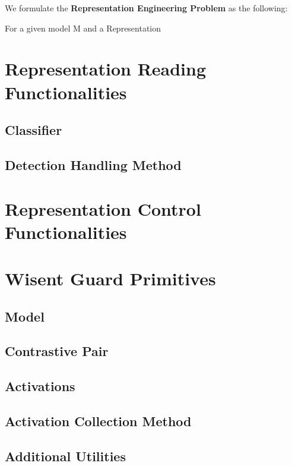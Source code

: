 \documentclass{article}
\begin{document}
We formulate the \textbf{Representation Engineering Problem} as the following: 

For a given model M and a Representation 


\section{Representation Reading Functionalities}

\subsection{Classifier}

\subsection{Detection Handling Method}

\section{Representation Control Functionalities}




\appendix

\section{Wisent Guard Primitives}

\subsection{Model}

\subsection{Contrastive Pair}

\subsection{Activations}

\subsection{Activation Collection Method}

\subsection{Additional Utilities}
\end{document}
